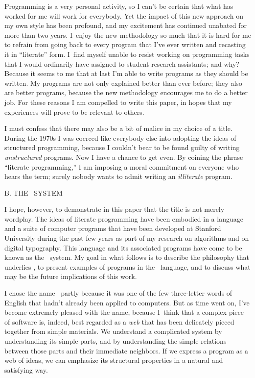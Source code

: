 Programming is a very personal activity, so I can't be certain that what has
worked for me will work for everybody. Yet the impact of this new approach on
my own style has been profound, and my excitement has continued unabated
for more than two years. I~enjoy the new methodology so much that it is hard
for me to refrain from going back to every program that I've ever written
and recasting it in ``literate'' form. I~find myself unable to resist working
on programming tasks that I would ordinarily have assigned to student
research assistants; and why? Because it seems to me that at last I'm able
to write programs as they should be written. My programs are not only
explained better than ever before; they also are better programs,
because the new methodology encourages me to do a better job. For these
reasons I am compelled to write this paper, in hopes that my experiences
will prove to be relevant to others.

I must confess that there may also be a bit of malice in my choice of
a title. During the 1970s I was coerced like everybody else into adopting
the ideas of structured programming, because I couldn't bear to be found
guilty of writing {\it unstructured\/} programs. Now I have a chance
to get even. By coining the phrase ``literate programming,'' I am imposing
a moral commitment on everyone who hears the term; surely nobody wants
to admit writing an {\it il{}literate\/} program.

\beginsection B. THE \WEB\ SYSTEM

I hope, however, to demonstrate in this paper that the title is not merely
wordplay. The ideas of literate programming have been embodied in a language
and a suite of computer programs that have been developed at Stanford
University during the past few years as part of my research on algorithms
and on digital typography. This language and its associated programs
have come to be known as the \WEB\ system. My goal in what follows is
to describe the philosophy that underlies \WEB, to present examples
of programs in the \WEB\ language, and to discuss what may be the future
implications of this work.

I chose the name \WEB\ partly because it was one of the few three-letter
words of English that hadn't already been applied to computers. But as time
went on, I've become extremely pleased with the name, because I~think
that a complex piece of software is, indeed, best regarded as a {\it web\/}
that has been delicately pieced together from simple materials. We
understand a complicated system by understanding its simple parts, and by
understanding the simple relations between those parts and their immediate
neighbors. If we express a program as a web of ideas, we can emphasize
its structural properties in a natural and satisfying way.

